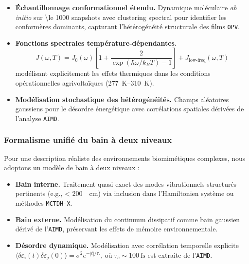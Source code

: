 \documentclass[12pt, a4paper]{article}
\begin{document}
\begin{itemize}
    \item \textbf{Échantillonnage conformationnel étendu.} Dynamique moléculaire \textit{ab initio} sur \num{\le 1000} snapshots avec clustering spectral pour identifier les conformères dominants, capturant l'hétérogénéité structurale des films \texttt{OPV}.
    
    \item \textbf{Fonctions spectrales température-dépendantes.}
    \begin{equation}
    J(\omega, T) = J_0(\omega)\left[1 + \frac{2}{\exp(\hbar\omega/k_B T) - 1}\right] + J_{\text{low-freq}}(\omega, T)
    \end{equation}
    modélisant explicitement les effets thermiques dans les conditions opérationnelles agrivoltaïques (\SIrange{277}{310}{\kelvin}).
    
    \item \textbf{Modélisation stochastique des hétérogénéités.} Champs aléatoires gaussiens pour le désordre énergétique avec corrélations spatiales dérivées de l'analyse \texttt{AIMD}.
\end{itemize}

\subsubsection{Formalisme unifié du bain à deux niveaux}

Pour une description réaliste des environnements biomimétiques complexes, nous adoptons un modèle de bain à deux niveaux :

\begin{itemize}
    \item \textbf{Bain interne.} Traitement quasi-exact des modes vibrationnels structurés pertinents (e.g., < \SI{200}{\per\centi\meter}) via inclusion dans l'Hamiltonien système ou méthodes \texttt{MCTDH-X}.
    
    \item \textbf{Bain externe.} Modélisation du continuum dissipatif comme bain gaussien dérivé de l'\texttt{AIMD}, préservant les effets de mémoire environnementale.
    
    \item \textbf{Désordre dynamique.} Modélisation avec corrélation temporelle explicite $\langle \delta \varepsilon_i(t) \delta \varepsilon_j(0) \rangle = \sigma^2 e^{-|t|/\tau_c}$, où $\tau_c \sim \SI{100}{\femto\second}$ est extraite de l'\texttt{AIMD}.
\end{itemize}
\end{document}
